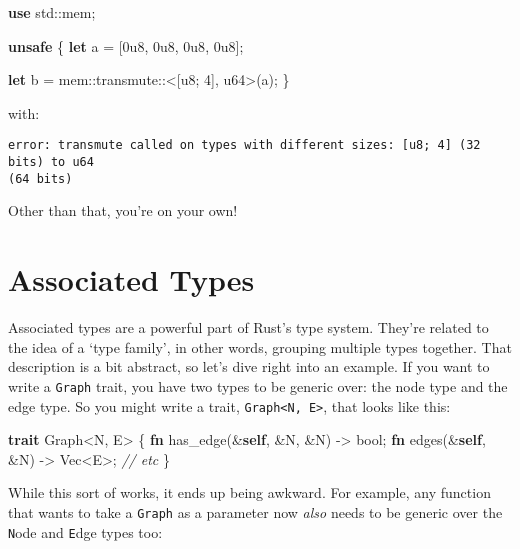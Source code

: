 \documentclass[a4paper,]{book}
\newenvironment{Shaded}{\begin{snugshade}}{\end{snugshade}}
\newcommand{\KeywordTok}[1]{\textcolor[rgb]{0.13,0.29,0.53}{\textbf{{#1}}}}
\newcommand{\DataTypeTok}[1]{\textcolor[rgb]{0.13,0.29,0.53}{{#1}}}
\newcommand{\DecValTok}[1]{\textcolor[rgb]{0.00,0.00,0.81}{{#1}}}
\newcommand{\CommentTok}[1]{\textcolor[rgb]{0.56,0.35,0.01}{\textit{{#1}}}}
\newcommand{\NormalTok}[1]{{#1}}
\begin{document}
\begin{Shaded}
\begin{Highlighting}[]
\KeywordTok{use} \NormalTok{std::mem;}

\KeywordTok{unsafe} \NormalTok{\{}
    \KeywordTok{let} \NormalTok{a = [}\DecValTok{0u8}\NormalTok{, }\DecValTok{0u8}\NormalTok{, }\DecValTok{0u8}\NormalTok{, }\DecValTok{0u8}\NormalTok{];}

    \KeywordTok{let} \NormalTok{b = mem::transmute::<[}\DataTypeTok{u8}\NormalTok{; }\DecValTok{4}\NormalTok{], }\DataTypeTok{u64}\NormalTok{>(a);}
\NormalTok{\}}
\end{Highlighting}
\end{Shaded}

with:

\begin{verbatim}
error: transmute called on types with different sizes: [u8; 4] (32 bits) to u64
(64 bits)
\end{verbatim}

Other than that, you're on your own!

\section{Associated Types}\label{sec--associated-types}

Associated types are a powerful part of Rust's type system. They're
related to the idea of a `type family', in other words, grouping
multiple types together. That description is a bit abstract, so let's
dive right into an example. If you want to write a \texttt{Graph} trait,
you have two types to be generic over: the node type and the edge type.
So you might write a trait,
\texttt{Graph\textless{}N,\ E\textgreater{}}, that looks like this:

\begin{Shaded}
\begin{Highlighting}[]
\KeywordTok{trait} \NormalTok{Graph<N, E> \{}
    \KeywordTok{fn} \NormalTok{has_edge(&}\KeywordTok{self}\NormalTok{, &N, &N) -> }\DataTypeTok{bool}\NormalTok{;}
    \KeywordTok{fn} \NormalTok{edges(&}\KeywordTok{self}\NormalTok{, &N) -> }\DataTypeTok{Vec}\NormalTok{<E>;}
    \CommentTok{// etc}
\NormalTok{\}}
\end{Highlighting}
\end{Shaded}

While this sort of works, it ends up being awkward. For example, any
function that wants to take a \texttt{Graph} as a parameter now
\emph{also} needs to be generic over the \texttt{N}ode and \texttt{E}dge
types too:
\end{document}
